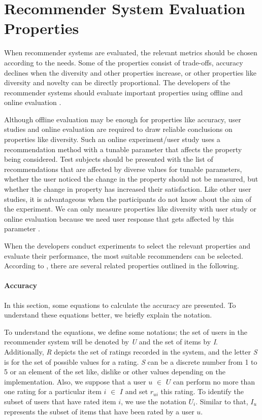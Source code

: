 
\section{Recommender System Evaluation Properties}\label{section:evaluation_metrics}

When recommender systems are evaluated, the relevant metrics should be chosen according to the needs. Some of the properties consist of trade-offs, accuracy declines when the diversity and other properties increase, or other properties like diversity and novelty can be directly proportional. The developers of the recommender systems should evaluate important properties using offline and online evaluation \cite{shani2011evaluating}.

Although offline evaluation may be enough for properties like accuracy, user studies and online evaluation are required to draw reliable conclusions on properties like diversity. Such an online experiment/user study uses a recommendation method with a tunable parameter that affects the property being considered. Test subjects should be presented with the list of recommendations that are affected by diverse values for tunable parameters, whether the user noticed the change in the property should not be measured, but whether the change in property has increased their satisfaction. Like other user studies, it is advantageous when the participants do not know about the aim of the experiment. We can only measure properties like diversity with user study or online evaluation because we need user response that gets affected by this parameter \cite{shani2011evaluating}.

When the developers conduct experiments to select the relevant properties and evaluate their performance, the most suitable recommenders can be selected. According to \cite{shani2011evaluating}, there are several related properties outlined in the following.


\paragraph{Accuracy}

In this section, some equations to calculate the accuracy are presented. To understand these equations better, we briefly explain the notation.

To understand the equations, we define some notations; the set of users in the recommender system will be denoted by \textit{U} and the set of items by \textit{I}. Additionally, \textit{R} depicts the set of ratings recorded in the system, and the letter \textit{S} is for the set of possible values for a rating. \textit{S} can be a discrete number from 1 to 5 or an element of the set {like, dislike} or other values depending on the implementation. Also, we suppose that a user $u$ $\in$  $U$ can perform no more than one rating for a particular item $i$ $\in$ $I$ and set $r_{ui}$ this rating. To identify the subset of users that have rated item $i$, we use the notation $U_i$. Similar to that, $I_u$ represents the subset of items that have been rated by a user $u$.

